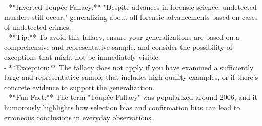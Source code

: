 \documentclass[a4paper,12pt,single,pdftex]{scrartcl}
\begin{document}
    
        - **Inverted Toupée Fallacy:** "Despite advances in forensic science, undetected murders still occur," generalizing about all forensic advancements based on cases of undetected crimes.
    \\

    
      - **Tip:** To avoid this fallacy, ensure your generalizations are based on a comprehensive and representative sample, and consider the possibility of exceptions that might not be immediately visible.
    \\

    
      - **Exception:** The fallacy does not apply if you have examined a sufficiently large and representative sample that includes high-quality examples, or if there's concrete evidence to support the generalization.
    \\

    
      - **Fun Fact:** The term "Toupée Fallacy" was popularized around 2006, and it humorously highlights how selection bias and confirmation bias can lead to erroneous conclusions in everyday observations.
    \\
\end{document}
